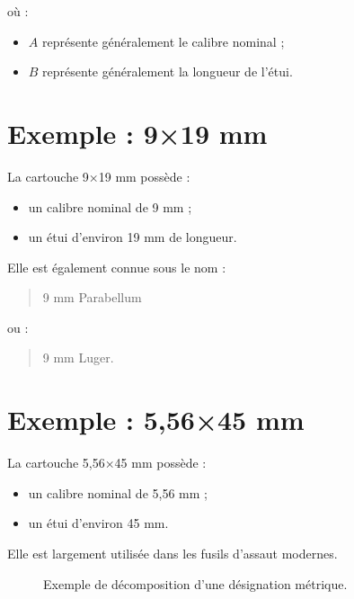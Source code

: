 où :

\begin{itemize}
    \item $A$ représente généralement le calibre nominal ;
    \item $B$ représente généralement la longueur de l'étui.
\end{itemize}

\section{Exemple : 9×19 mm}

La cartouche 9×19 mm possède :

\begin{itemize}
    \item un calibre nominal de 9 mm ;
    \item un étui d'environ 19 mm de longueur.
\end{itemize}

Elle est également connue sous le nom :

\begin{quote}
9 mm Parabellum
\end{quote}

ou :

\begin{quote}
9 mm Luger.
\end{quote}

\section{Exemple : 5,56×45 mm}

La cartouche 5,56×45 mm possède :

\begin{itemize}
    \item un calibre nominal de 5,56 mm ;
    \item un étui d'environ 45 mm.
\end{itemize}

Elle est largement utilisée dans les fusils d'assaut modernes.

\begin{figure}[htbp]
\centering


\caption{Exemple de décomposition d'une désignation métrique.}
\label{fig:designation_metrique}

\end{figure}

